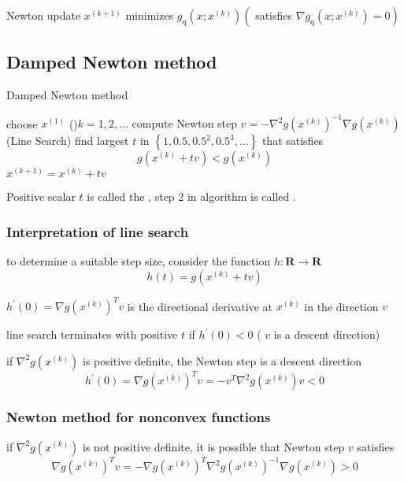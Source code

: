 Newton update $ x^{(k+1)} $ minimizes $ g_{\mathrm{q}}\left(x ; x^{(k)}\right)\left(\right. $ satisfies $ \left.\nabla g_{\mathrm{q}}\left(x ; x^{(k)}\right)=0\right) $


\subsection{Damped Newton method}

\begin{algorithm}
    \caption{Damped Newton method}
    choose $ x^{(1)} $\;
    \While(){$ k=1,2, \ldots $}{
        compute Newton step $ v=-\nabla^{2} g\left(x^{(k)}\right)^{-1} \nabla g\left(x^{(k)}\right) $\;
        (Line Search) find largest $ t $ in $ \left\{1,0.5,0.5^{2}, 0.5^{3}, \ldots\right\} $ that satisfies
        $$
        g\left(x^{(k)}+t v\right)<g\left(x^{(k)}\right)
        $$\;
        $ x^{(k+1)}=x^{(k)}+t v $\;
    }
\end{algorithm}

Positive scalar $ t $ is called the , step 2 in algorithm is called .

\subsubsection{Interpretation of line search} 

to determine a suitable step size, consider the function $ h: \mathbf{R} \rightarrow \mathbf{R} $
$$
h(t)=g\left(x^{(k)}+t v\right)
$$


$ h^{\prime}(0)=\nabla g\left(x^{(k)}\right)^{T} v $ is the directional derivative at $ x^{(k)} $ in the direction $ v $

line search terminates with positive $ t $ if $ h^{\prime}(0)<0 $ ( $ v $ is a descent direction)

if $ \nabla^{2} g\left(x^{(k)}\right) $ is positive definite, the Newton step is a descent direction
$$
h^{\prime}(0)=\nabla g\left(x^{(k)}\right)^{T} v=-v^{T} \nabla^{2} g\left(x^{(k)}\right) v<0
$$

\subsubsection{Newton method for nonconvex functions}

if $ \nabla^{2} g\left(x^{(k)}\right) $ is not positive definite, it is possible that Newton step $ v $ satisfies
$$
\nabla g\left(x^{(k)}\right)^{T} v=-\nabla g\left(x^{(k)}\right)^{T} \nabla^{2} g\left(x^{(k)}\right)^{-1} \nabla g\left(x^{(k)}\right)>0
$$

